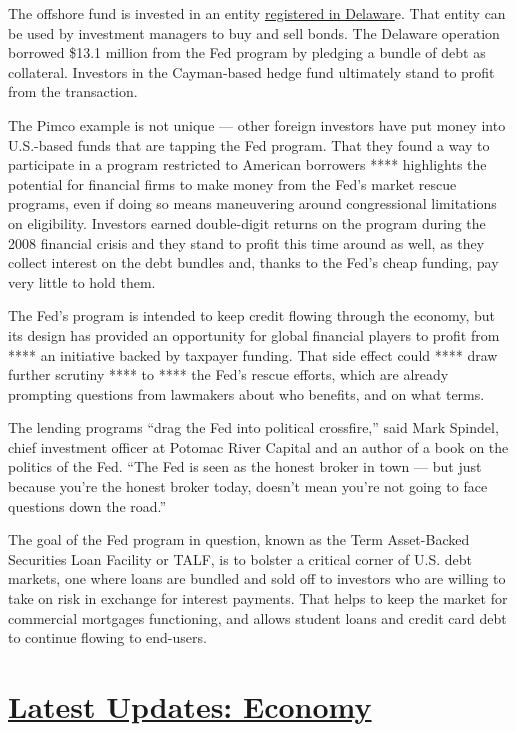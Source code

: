 The offshore fund is invested in an entity
\href{https://icis.corp.delaware.gov/ecorp/entitysearch/NameSearch.aspx}{registered
in Delawar}e. That entity can be used by investment managers to buy and
sell bonds. The Delaware operation borrowed \$13.1 million from the Fed
program by pledging a bundle of debt as collateral. Investors in the
Cayman-based hedge fund ultimately stand to profit from the transaction.

The Pimco example is not unique --- other foreign investors have put
money into U.S.-based funds that are tapping the Fed program. That they
found a way to participate in a program restricted to American borrowers
**** highlights the potential for financial firms to make money from the
Fed's market rescue programs, even if doing so means maneuvering around
congressional limitations on eligibility. Investors earned double-digit
returns on the program during the 2008 financial crisis and they stand
to profit this time around as well, as they collect interest on the debt
bundles and, thanks to the Fed's cheap funding, pay very little to hold
them.

The Fed's program is intended to keep credit flowing through the
economy, but its design has provided an opportunity for global financial
players to profit from **** an initiative backed by taxpayer funding.
That side effect could **** draw further scrutiny **** to **** the Fed's
rescue efforts, which are already prompting questions from lawmakers
about who benefits, and on what terms.

The lending programs ``drag the Fed into political crossfire,'' said
Mark Spindel, chief investment officer at Potomac River Capital and an
author of a book on the politics of the Fed. ``The Fed is seen as the
honest broker in town --- but just because you're the honest broker
today, doesn't mean you're not going to face questions down the road.''

The goal of the Fed program in question, known as the Term Asset-Backed
Securities Loan Facility or TALF, is to bolster a critical corner of
U.S. debt markets, one where loans are bundled and sold off to investors
who are willing to take on risk in exchange for interest payments. That
helps to keep the market for commercial mortgages functioning, and
allows student loans and credit card debt to continue flowing to
end-users.

\hypertarget{latest-updates-economy}{%
\section{\texorpdfstring{\href{https://www.nytimes.com/live/2020/07/31/business/stock-market-today-coronavirus?action=click\&pgtype=Article\&state=default\&region=MAIN_CONTENT_1\&context=storylines_live_updates}{Latest
Updates:
Economy}}{Latest Updates: Economy}}\label{latest-updates-economy}}

